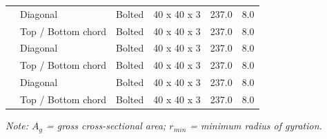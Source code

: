 \documentclass[12pt,a4paper]{report}
\numberwithin{table}{chapter}
\numberwithin{figure}{chapter}
\newcommand{\ReportTableRowGap}{6pt}
\begin{document}
\begin{longtable}{|C{2.0cm}|L{2.0cm}|L{2.2cm}|C{2.5cm}|C{2.0cm}|C{2.0cm}|}
\hline
{} & Diagonal & Bolted & 40 x 40 x 3 & 237.0 & 8.0 \\[\ReportTableRowGap]
 & Top / Bottom chord & Bolted & 40 x 40 x 3 & 237.0 & 8.0 \\[\ReportTableRowGap]
\hline
{} & Diagonal & Bolted & 40 x 40 x 3 & 237.0 & 8.0 \\[\ReportTableRowGap]
 & Top / Bottom chord & Bolted & 40 x 40 x 3 & 237.0 & 8.0 \\[\ReportTableRowGap]
\hline
{} & Diagonal & Bolted & 40 x 40 x 3 & 237.0 & 8.0 \\[\ReportTableRowGap]
 & Top / Bottom chord & Bolted & 40 x 40 x 3 & 237.0 & 8.0 \\[\ReportTableRowGap]
\hline
\end{longtable}
\noindent\textit{Note: $A_g$ = gross cross-sectional area; $r_{min}$ = minimum radius of gyration.}
\end{document}
